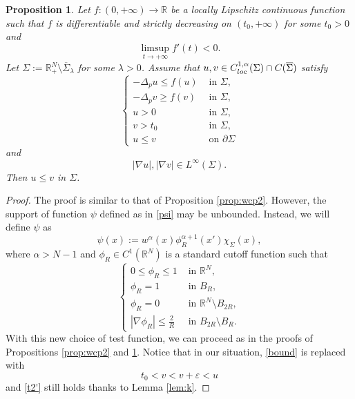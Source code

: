 \documentclass[reqno]{amsart}
\theoremstyle{plain}
\newtheorem{proposition}[theorem]{Proposition}
\theoremstyle{definition}
\theoremstyle{remark}
\begin{document}
	\begin{proposition}\label{prop:wcp3}
		Let $f:(0,+\infty)\to\mathbb{R}$ be a locally Lipschitz continuous function such that $f$ is differentiable and strictly decreasing on $(t_0,+\infty)$ for some $t_0>0$ and
		\[
		\limsup_{t\to+\infty} f'(t) < 0.
		\]		
		Let $\Sigma := \mathbb{R}^N_+\setminus \overline\Sigma_\lambda$ for some $\lambda>0$. Assume that $u, v \in C^{1,\alpha}_{\rm loc}(\Sigma) \cap C(\overline{\Sigma})$ satisfy
		\[
		\begin{cases}
			-\Delta_p u \le f(u) &\text{ in } \Sigma,\\
			-\Delta_p v \ge f(v) &\text{ in } \Sigma,\\
			u>0 &\text{ in } \Sigma,\\
			v>t_0 &\text{ in } \Sigma,\\
			u \le v &\text{ on } \partial\Sigma
		\end{cases}
		\]
		and
		\[
		|\nabla u|, |\nabla v| \in L^\infty(\Sigma).
		\]
		Then $u\le v$ in $\Sigma$.
	\end{proposition}
	\begin{proof}
		The proof is similar to that of Proposition \ref{prop:wcp2}. However, the support of function $\psi$ defined as in \eqref{psi} may be unbounded. Instead, we will define $\psi$ as
		\[	
		\psi(x) := w^{\alpha}(x) \phi_R^{\alpha+1}(x') \chi_{\Sigma}(x),
		\]
		where $\alpha>N-1$ and $\phi_R \in C^1(\mathbb{R}^N)$ is a standard cutoff function such that
		\begin{equation}
			\begin{cases}
				0 \le \phi_R \le 1 &\text{ in } \mathbb{R}^N,\\
				\phi_R = 1 &\text{ in } B_R,\\
				\phi_R = 0 &\text{ in } \mathbb{R}^N \setminus B_{2R},\\
				|\nabla\phi_R| \le \frac{2}{R} &\text{ in } B_{2R} \setminus B_R.
			\end{cases}
		\end{equation}
		With this new choice of test function, we can proceed as in the proofs of Propositions \ref{prop:wcp2} and \ref{prop:wcp3}. Notice that in our situation, \eqref{bound} is replaced with
		\[
		t_0 < v < v+\varepsilon < u
		\]
		and \eqref{t2'} still holds thanks to Lemma \ref{lem:k}.
	\end{proof}
	
\end{document}

